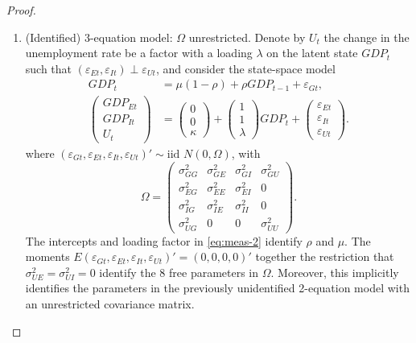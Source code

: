 \documentclass[oneside,reqno]{amsart}
\newcommand{\eps}{\varepsilon}
\theoremstyle{definition}
\begin{document}
\begin{enumerate}[label=(\roman*)]
\begin{proof}
\begin{enumerate}[label=(\arabic*)]
\item
(Identified) 3-equation model: $\Omega$ unrestricted. Denote by $U_t$ the change in the unemployment rate be a factor with a loading $\lambda$ on the latent state $GDP_t$ such that $(\eps_{Et}, \eps_{It}) \perp \eps_{Ut}$, and consider the state-space model  
\begin{align}
	GDP_t &= \mu(1-\rho) + \rho GDP_{t-1} + \eps_{Gt}, \label{eq:state-2} \\
	\begin{pmatrix}
		GDP_{Et}  \\ GDP_{It} \\ U_t
	\end{pmatrix} 
	&= \begin{pmatrix}
		0 \\ 0 \\ \kappa
	\end{pmatrix} 
	+ \begin{pmatrix}
		1 \\ 1 \\ \lambda		
	\end{pmatrix} GDP_t
	+ \begin{pmatrix}
		\eps_{Et} \\ \eps_{It} \\ \eps_{Ut}
	\end{pmatrix}  \label{eq:meas-2}.
\end{align}
where $(\eps_{Gt}, \eps_{Et}, \eps_{It}, \eps_{Ut})' \sim \text{iid } N(0, \Omega)$, with 
\begin{equation}
	\Omega = \begin{pmatrix}
		\sigma_{GG}^2&\sigma_{GE}^2 &\sigma_{GI}^2&\sigma_{GU}^2 \\
		\sigma_{EG}^2 & \sigma_{EE}^2 & \sigma_{EI}^2 & 0\\
		\sigma_{IG}^2 & \sigma_{IE}^2 &  \sigma_{II}^2 & 0\\
		\sigma_{UG}^2 & 0 & 0 & \sigma_{UU}^2
	\end{pmatrix}.
\end{equation}
The intercepts and loading factor in \eqref{eq:meas-2}  identify $\rho$ and $\mu$. The moments $E(\eps_{Gt}, \eps_{Et}, \eps_{It}, \eps_{Ut})' = (0,0,0,0)'$  together the restriction that $\sigma_{UE}^2 = \sigma_{UI}^2 = 0$ identify the 8 free parameters in $\Omega$. Moreover, this implicitly identifies the parameters in the previously unidentified 2-equation model with an unrestricted covariance matrix.
\end{enumerate}
\end{proof}

\end{enumerate}
\end{document}
